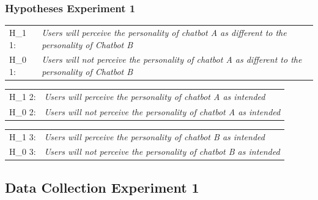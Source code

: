     \subsubsection{Hypotheses Experiment 1}
    
    \begin{table}[h]
    \begin{tabular}{ll}
    H_1 1: & \textit{Users will perceive the personality of chatbot A as different to the personality of Chatbot B} \\
    H_0 1: & \textit{Users will not perceive the personality of chatbot A as different to the personality of Chatbot B} \\
    \end{tabular}
    \end{table}
    
    \begin{table}[h]
    \begin{tabular}{ll}
    H_1 2: & \textit{Users will perceive the personality of chatbot A as intended} \\
    H_0 2: & \textit{Users will not perceive the personality of chatbot A as intended} \\
    \end{tabular}
    \end{table}
    
    \begin{table}[h]
    \begin{tabular}{ll}
    H_1 3: & \textit{Users will perceive the personality of chatbot B as intended} \\
    H_0 3: & \textit{Users will not perceive the personality of chatbot B as intended} \\
    \end{tabular}
    \end{table}
    
\subsection{Data Collection Experiment 1}

